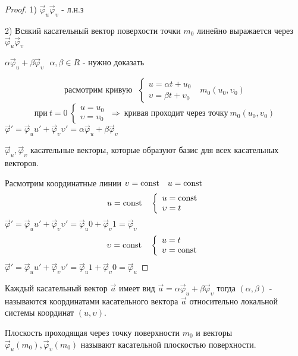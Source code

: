 \begin{proof}
  1) $\vec \varphi_u \vec \varphi_{\upsilon}$ - л.н.з

  2) Всякий касательный вектор поверхости точки $m_0$ линейно выражается через
  $\vec \varphi_u \vec \varphi_{\upsilon}$

  $\alpha \vec \varphi_u +\beta \vec \varphi_{\upsilon} ~~~
  \alpha, \beta \in R$ - нужно доказать

  $$
  \text{расмотрим кривую} ~~~
  \left\{
    \begin{array}{l}
      u = \alpha t + u_0 \\
      \upsilon = \beta t + \upsilon_0
    \end{array}
  \right. ~~~ m_0 (u_0, \upsilon_0)
  $$
  $$
  \text{при} ~ t = 0 ~
  \left\{
    \begin{array}{l}
      u = u_0 \\
      \upsilon = \upsilon_0
    \end{array}
  \right. ~ \Rightarrow ~ \text{кривая проходит через точку} ~
  m_0 (u_0, \upsilon_0)
  $$
  $\vec \varphi' = \vec \varphi_u u' + \vec \varphi_{\upsilon}
  \upsilon' = \alpha \vec \varphi_u + \beta \vec \varphi_{\upsilon}$

  $\vec \varphi_u, \vec \varphi_{\upsilon}$ касательные векторы, которые
  образуют базис для всех касательных векторов.

  Расмотрим координатные линии $\upsilon = \mathrm{const} ~~~ u = \mathrm{const}$
  $$
  u = \mathrm{const} ~~~
  \left\{
    \begin{array}{l}
      u = \mathrm{const} \\
      \upsilon = t
    \end{array}
  \right.
  $$
  $\vec \varphi' = \vec \varphi_u u' + \vec \varphi_{\upsilon}
  \upsilon' = \vec \varphi_u 0 + \vec \varphi_{\upsilon} 1 =
  \vec \varphi_{\upsilon}$
  $$
  \upsilon = \mathrm{const} ~~~
  \left\{
    \begin{array}{l}
      u = t \\
      \upsilon = \mathrm{const}
    \end{array}
  \right.
  $$
  $\vec \varphi' = \vec \varphi_u u' + \vec \varphi_{\upsilon}
  \upsilon' = \vec \varphi_u 1 + \vec \varphi_{\upsilon} 0 = \vec \varphi_u$
\end{proof}

\begin{define}
  Каждый касательный вектор $\vec a$ имеет вид $\vec a =
  \alpha \vec \varphi_u + \beta \vec \varphi_{\upsilon}$ тогда
  $(\alpha, \beta)$ - называются
  координатами касательного вектора $\vec a$ относительно локальной системы
  координат $(u, \upsilon)$.
\end{define}

\begin{define}
  Плоскость проходящая через точку поверхности $m_0$ и векторы
  $\vec \varphi_u (m_0), \vec \varphi_{\upsilon}(m_0)$ называют касательной
  плоскостью поверхности.
\end{define}
